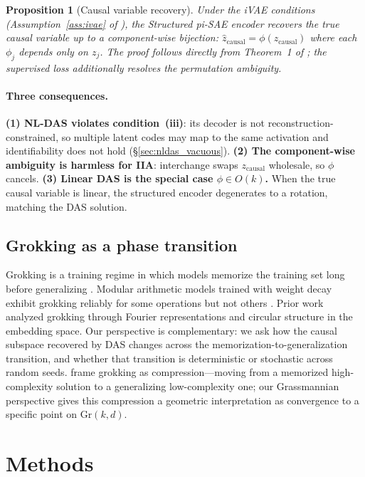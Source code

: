 \documentclass{article}
\newcommand{\Gr}{\mathrm{Gr}}
\newtheorem{proposition}{Proposition}
\begin{document}
\begin{proposition}[Causal variable recovery]
\label{prop:recovery}
Under the iVAE conditions (Assumption~\ref{ass:ivae} of
\citet{khemakhem2020variational}), the Structured pi-SAE encoder recovers
the true causal variable up to a component-wise bijection:
$\hat{z}_\text{causal} = \phi(z_\text{causal})$ where each $\phi_j$ depends
only on $z_j$. The proof follows directly from Theorem~1 of
\citet{khemakhem2020variational}; the supervised loss additionally resolves
the permutation ambiguity.
\label{ass:ivae}
\end{proposition}

\paragraph{Three consequences.}
\textbf{(1) NL-DAS violates condition~(iii)}:
its decoder is not reconstruction-constrained, so multiple latent codes may
map to the same activation and identifiability does not hold
(\S\ref{sec:nldas_vacuous}).
\textbf{(2) The component-wise ambiguity is harmless for IIA}:
interchange swaps $z_\text{causal}$ wholesale, so $\phi$ cancels.
\textbf{(3) Linear DAS is the special case $\phi \in O(k)$.}
When the true causal variable is linear, the structured encoder degenerates
to a rotation, matching the DAS solution.

\subsection{Grokking as a phase transition}

Grokking is a training regime in which models memorize the training set long
before generalizing \citep{power2022grokking}. Modular arithmetic models trained
with weight decay exhibit grokking reliably for some operations but not others
\citep{nanda2023progress, zhong2024clock}. Prior work analyzed grokking through
Fourier representations and circular structure in the embedding space. Our
perspective is complementary: we ask how the causal subspace recovered by DAS
changes across the memorization-to-generalization transition, and whether that
transition is deterministic or stochastic across random seeds.
\citet{liu2023grokking} frame grokking as compression---moving from a memorized
high-complexity solution to a generalizing low-complexity one; our Grassmannian
perspective gives this compression a geometric interpretation as convergence to a
specific point on $\Gr(k,d)$.


\section{Methods}
\label{sec:methods}
\end{document}
